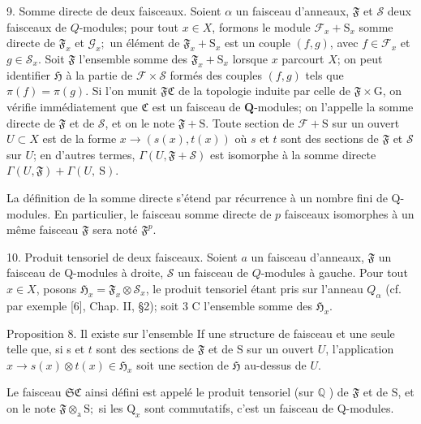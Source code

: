 9. Somme directe de deux faisceaux. Soient $\alpha$ un faisceau d'anneaux, $\mathfrak{F}$ et $\mathcal{S}$ deux faisceaux de $Q$-modules; pour tout $x \in X$, formons le module $\mathcal{F}_{x}+\mathrm{S}_{x}$ somme directe de $\mathfrak{F}_{x}$ et $\mathcal{G}_{x} ;$ un élément de $\mathfrak{F}_{x}+\mathrm{S}_{x}$ est un couple $(f, g)$, avec $f \in \mathcal{F}_{x}$ et $g \in \mathcal{S}_{x}$. Soit $\mathfrak{F}$ l'ensemble somme des $\mathfrak{F}_{x}+\mathrm{S}_{x}$ lorsque $x$ parcourt $X$; on peut identifier $\mathfrak{H}$ à la partie de $\mathcal{F} \times \mathcal{S}$ formés des couples $(f, g)$ tels que $\pi(f)=\pi(g)$. Si l'on munit $\mathfrak{F C}$ de la topologie induite par celle de $\mathfrak{F} \times \mathrm{G}$, on vérifie immédiatement que $\mathfrak{C}$ est un faisceau de $\boldsymbol{Q}$-modules; on l'appelle la somme directe de $\mathfrak{F}$ et de $\mathcal{S}$, et on le note $\mathfrak{F}+\mathrm{S}$. Toute section de $\mathcal{F}+\mathrm{S}$ sur un ouvert $U \subset X$ est de la forme $x \rightarrow(s(x), t(x))$ où $s$ et $t$ sont des sections de $\mathfrak{F}$ et $\mathcal{S}$ sur $U$; en d'autres termes, $\Gamma(U, \mathfrak{F}+\mathcal{S})$ est isomorphe à la somme directe $\Gamma(U, \mathfrak{F})+\Gamma(U, \mathrm{~S})$.

La définition de la somme directe s'étend par récurrence à un nombre fini de Q-modules. En particulier, le faisceau somme directe de $p$ faisceaux isomorphes à un même faisceau $\mathfrak{F}$ sera noté $\mathfrak{F}^{p}$.

10. Produit tensoriel de deux faisceaux. Soient $a$ un faisceau d'anneaux, $\mathfrak{F}$ un faisceau de Q-modules à droite, $\mathcal{S}$ un faisceau de $Q$-modules à gauche. Pour tout $x \in X$, posons $\mathfrak{H}_{x}=\mathfrak{F}_{x} \otimes \mathcal{S}_{x}$, le produit tensoriel étant pris sur l'anneau $Q_{\alpha}$ (cf. par exemple [6], Chap. II, §2); soit 3 C l'ensemble somme des $\mathfrak{H}_{x}$.

Proposition 8. Il existe sur l'ensemble If une structure de faisceau et une seule telle que, si s et $t$ sont des sections de $\mathfrak{F}$ et de $\mathrm{S}$ sur un ouvert $U$, l'application $x \rightarrow s(x) \otimes t(x) \in \mathfrak{H}_{x}$ soit une section de $\mathfrak{H}$ au-dessus de $U$.

Le faisceau $\mathfrak{S C}$ ainsi défini est appelé le produit tensoriel (sur $\mathbb{Q}$ ) de $\mathfrak{F}$ et de $\mathrm{S}$, et on le note $\mathfrak{F} \otimes_{\mathrm{a}} \mathrm{S} ;$ si les $\mathrm{Q}_{x}$ sont commutatifs, c'est un faisceau de Q-modules.

